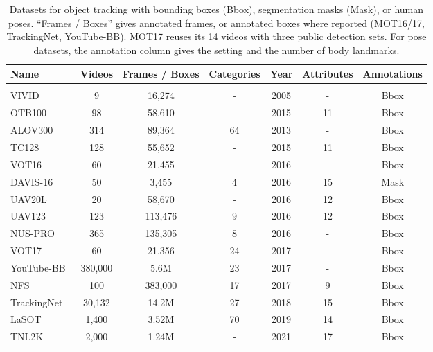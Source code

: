 \begin{table}[!ht]
\centering
\caption{Datasets for object tracking with bounding boxes (Bbox), segmentation masks (Mask), or human poses. ``Frames / Boxes'' gives annotated frames, or annotated boxes where reported (MOT16/17, TrackingNet, YouTube-BB). MOT17 reuses its 14 videos with three public detection sets. For pose datasets, the annotation column gives the setting and the number of body landmarks.}
\label{tab:video_object_tracking_dataset}
\fontsize{9}{11}\selectfont
\setlength{\tabcolsep}{2.2mm}
\begin{tabular}{lcccccc}
\toprule
 \textbf{Name} & \textbf{Videos} & \textbf{Frames / Boxes} & \textbf{Categories} & \textbf{Year} & \textbf{Attributes} & \textbf{Annotations}\\
 \midrule
\rowcolor{lightgrey} \multicolumn{7}{l}{$\bullet$ \textit{Single Object Tracking}} \\
VIVID~\cite{collins2005open} &   9 &  16,274 &  - & 2005 & - & Bbox\\
OTB100~\cite{wu2013online} &   98 &  58,610 &  -  & 2015 & 11 & Bbox\\
ALOV300~\cite{smeulders2013visual} &   314 &  89,364 &   64 & 2013 & - & Bbox\\
TC128~\cite{liang2015encoding} &   128 &  55,652 &  - &  2015  & 11 & Bbox\\
VOT16~\cite{roffo2016visual} &   60 &  21,455 &  - & 2016 & - & Bbox\\
DAVIS-16~\cite{perazzi2016benchmark} & 50 &  3,455 & 4 & 2016 & 15& Mask \\
UAV20L~\cite{benchmark2016uav} &   20 &  58,670 &   -  & 2016 & 12 & Bbox\\
UAV123~\cite{benchmark2016uav} &   123 &  113,476 &   9  & 2016 & 12 & Bbox\\
NUS-PRO~\cite{nus_pro} &   365 &  135,305 &  8 & 2016 & - & Bbox\\
VOT17~\cite{alatan2017visual} &   60 &  21,356 & 24 & 2017 & - & Bbox\\
YouTube-BB~\cite{real2017youtube} &   380,000 &  5.6M &  23  & 2017  & - & Bbox\\
NFS~\cite{kiani2017need} &   100 &  383,000 &   17  & 2017 & 9 & Bbox\\
TrackingNet~\cite{muller2018trackingnet} &   30,132 &  14.2M &   27  & 2018 & 15  & Bbox\\
LaSOT~\cite{fan2019lasot}  &  1,400  & 3.52M &  70 & 2019 & 14 & Bbox\\
TNL2K~\cite{wang2021tnl2k} &  2,000  &  1.24M &  - & 2021 & 17 & Bbox\\

\end{tabular}
\end{table}
